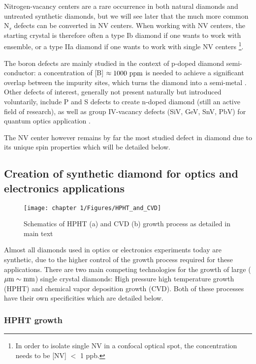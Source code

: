 \documentclass[a4paper,11pt]{report}
\begin{document}
\begin{refsection}
Nitrogen-vacancy centers are a rare occurrence in both natural diamonds and untreated synthetic diamonds, but we will see later that the much more common N$_s$ defects can be converted in NV centers. When working with NV centers, the starting crystal is therefore often a type Ib diamond if one wants to work with ensemble, or a type IIa diamond if one wants to work with single NV centers \footnote{In order to isolate single NV in a confocal optical spot, the concentration needs to be [NV] $<$ 1 ppb.}.

The boron defects are mainly studied in the context of p-doped diamond semi-conductor: a concentration of [B] $\approx 1000\ \rm ppm$ is needed to achieve a significant overlap between the impurity sites, which turns the diamond into a semi-metal \citep{macpherson2015practical}. Other defects of interest, generally not present naturally but introduced voluntarily, include P and S defects to create n-doped diamond \citep{das2022diamond} (still an active field of research), as well as group IV-vacancy defects (SiV, GeV, SnV, PbV) for quantum optics application \citep{bradac2019quantum}. 

The NV center however remains by far the most studied defect in diamond due to its unique spin properties which will be detailed below.

\subsection{Creation of synthetic diamond for optics and electronics applications}
\begin{figure}[h!]
\centering
\texttt{[image: chapter 1/Figures/HPHT\_and\_CVD]}
\caption{Schematics of HPHT (a) and CVD (b) growth process as detailed in main text}
\label{HPHT and CVD}
\end{figure}

Almost all diamonds used in optics or electronics experiments today are synthetic, due to the higher control of the growth process required for these applications. There are two main competing technologies for the growth of large ($\mu \rm{m} \sim \rm{mm}$) single crystal diamonds: High pressure high temperature growth (HPHT) and chemical vapor deposition growth (CVD). Both of these processes have their own specificities which are detailed below.

\subsubsection{HPHT growth}


\end{refsection}
\end{document}
